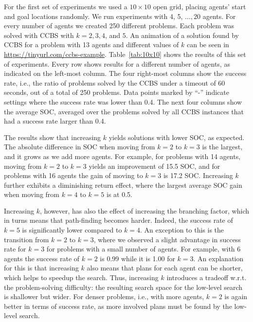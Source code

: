 \documentclass[review]{elsarticle}
\newcommand\roni[1]{\nb{\textbf{Roni:}}{green}{#1}}
\newcommand{\ccbs}{\ac{CCBS}\xspace}
\begin{document}
For the first set of experiments we used a
$10\times 10$ open grid, placing agents' start and goal locations randomly. We run experiments with 4, 5, $\ldots, 20$ agents. For every number of agents we created 250 different problems. 
Each problem was solved with \ccbs with $k=2, 3, 4$, and $5$. 
An animation of a solution found by \ccbs for a problem with 13 agents and different values of $k$ can be seen in \url{https://tinyurl.com/ccbs-example}.
Table~\ref{tab:10x10} shows the results of this set of experiments. 
 Every row shows results for a different number of agents, 
as indicated on the left-most column. 
The four right-most columns show the success rate, i.e., the ratio of problems solved by the \ccbs under a timeout of 60 %
seconds, out of a total of 250 problems. 
Data points marked by ``-'' indicate settings where the success rate was lower than 0.4. The next four columns show the average \ac{SOC}, 
averaged over the problems solved by all \ccbs instances that had a success rate larger than 0.4. 


The results show that increasing $k$ yields solutions with lower \ac{SOC}, as expected. 
The absolute difference in \ac{SOC} when moving from $k=2$ to $k=3$ is the largest, and it grows as we add more agents. For example, for problems with 14 agents, moving from $k=2$ to $k=3$ yields an improvement of 15.5 \ac{SOC}, 
and for problems with 16 agents the gain of moving to $k=3$ is 17.2 \ac{SOC}. Increasing $k$ further exhibits a diminishing return effect, where the largest average \ac{SOC} gain when moving from $k=4$ to $k=5$ is at 0.5. 



Increasing $k$, however, has also the effect of increasing the branching factor, which in turns means that path-finding becomes harder. Indeed, the success rate of $k=5$ is significantly lower compared to $k=4$. An exception to this is the transition from $k=2$ to $k=3$, where we observed a slight advantage in success rate for $k=3$ for problems with a small number of agents. For example, with 6 agents the success rate of $k=2$ is 0.99 while it is 1.00 for $k=3$. An explanation for this is that increasing $k$ also means that plans for each agent can be shorter, which helps to speedup the search. Thus, increasing $k$ introduces a tradeoff w.r.t. the problem-solving difficulty: the resulting search space for the low-level search is shallower but wider. For denser problems, i.e., with more agents, $k=2$ is again better in terms of success rate, as more involved plans must be found by the low-level search. 
\end{document}
